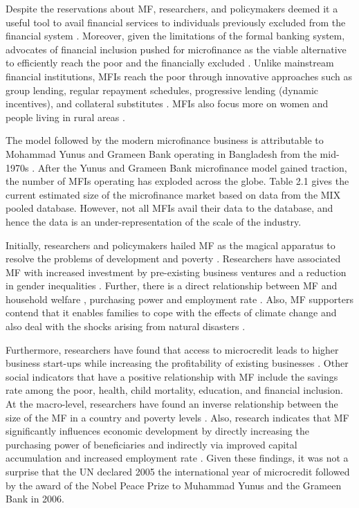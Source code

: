 \documentclass[a4paper, nobind]{templates/ociamthesis}
\begin{document}
Despite the reservations about MF, researchers, and policymakers deemed it a useful tool to avail financial services to individuals previously excluded from the financial system \autocite{d2017ngos}. Moreover, given the limitations of the formal banking system, advocates of financial inclusion pushed for microfinance as the viable alternative to efficiently reach the poor and the financially excluded \autocite{chester2016one}. Unlike mainstream financial institutions, MFIs reach the poor through innovative approaches such as group lending, regular repayment schedules, progressive lending (dynamic incentives), and collateral substitutes \autocite{chester2016one}. MFIs also focus more on women and people living in rural areas \autocite{ghosh2013microfinance}.

The model followed by the modern microfinance business is attributable to Mohammad Yunus and Grameen Bank operating in Bangladesh from the mid-1970s \autocite{ghosh2013microfinance}. After the Yunus and Grameen Bank microfinance model gained traction, the number of MFIs operating has exploded across the globe. Table 2.1 gives the current estimated size of the microfinance market based on data from the MIX pooled database. However, not all MFIs avail their data to the database, and hence the data is an under-representation of the scale of the industry.

Initially, researchers and policymakers hailed MF as the magical apparatus to resolve the problems of development and poverty \autocite{ghosh2013microfinance}. Researchers have associated MF with increased investment by pre-existing business ventures \textcite{newman2017microfinance} and a reduction in gender inequalities \autocites{shahriar2017lender}[@][]{newman2017microfinance,mafukata2017reciprocal,zhang2017microfinance}. Further, there is a direct relationship between MF and household welfare \autocite{meador2017food,you2013role}, purchasing power and employment rate \autocite{lopatta2016microfinance,raihan2017macro}. Also, MF supporters contend that it enables families to cope with the effects of climate change \textcite{fenton2017role} and also deal with the shocks arising from natural disasters \autocite{calis2017does}.

Furthermore, researchers have found that access to microcredit leads to higher business start-ups while increasing the profitability of existing businesses \autocite{demirguc2017financial}. Other social indicators that have a positive relationship with MF include the savings rate among the poor, health, child mortality, education, and financial inclusion\autocite{shahriar2017lender,o2017systematic}. At the macro-level, researchers have found an inverse relationship between the size of the MF in a country and poverty levels \autocite{ahlin2011does}. Also, research indicates that MF significantly influences economic development by directly increasing the purchasing power of beneficiaries and indirectly via improved capital accumulation and increased employment rate \autocite{lopatta2016microfinance,raihan2017macro}. Given these findings, it was not a surprise that the UN declared 2005 the international year of microcredit followed by the award of the Nobel Peace Prize to Muhammad Yunus and the Grameen Bank in 2006.
\end{document}
